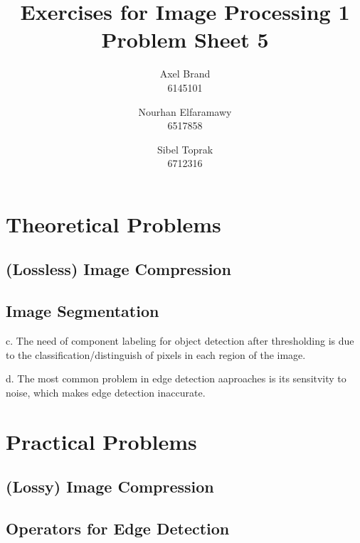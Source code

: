 \documentclass[a4paper,twocolumn]{article}
\title{\textbf{Exercises for Image Processing 1}\\Problem Sheet 5}
\author{Axel Brand\\6145101 \and Nourhan Elfaramawy\\6517858 \and Sibel Toprak\\6712316}
\begin{document}
	\maketitle
	
	\section{Theoretical Problems}
	
	

	
	\subsection{(Lossless) Image Compression}
	
	\subsection{Image Segmentation}
	
	c. The need of component labeling for object detection after thresholding is due to the classification/distinguish of pixels in each region of the image.
	
	d. The most common problem in edge detection aaproaches is its sensitvity to noise, which makes edge detection inaccurate.
	\section{Practical Problems}
	
	\subsection{(Lossy) Image Compression}
	
	\subsection{Operators for Edge Detection}
	
\end{document}
